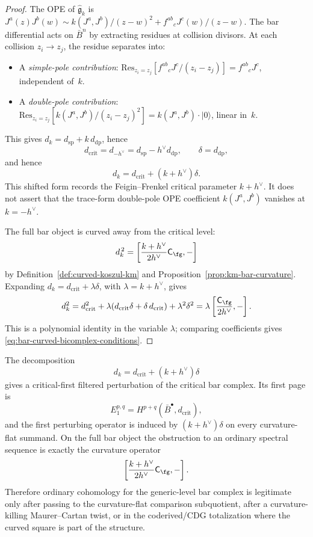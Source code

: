 \begin{proof}
The OPE of $\widehat{\mathfrak{g}}_k$ is
$J^a(z) J^b(w) \sim k(J^a, J^b)/(z-w)^2 + f^{ab}{}_c J^c(w)/(z-w)$.
The bar differential acts on $\bar{B}^n$ by extracting residues at collision
divisors. At each collision $z_i \to z_j$, the residue
separates into:
\begin{itemize}
\item A \emph{simple-pole contribution}:
$\mathrm{Res}_{z_i = z_j}[f^{ab}{}_c J^c / (z_i - z_j)]
= f^{ab}{}_c J^c$, independent of~$k$.
\item A \emph{double-pole contribution}:
$\mathrm{Res}_{z_i = z_j}[k(J^a, J^b) / (z_i - z_j)^2]
= k(J^a, J^b) \cdot |0\rangle$, linear in~$k$.
\end{itemize}
This gives \(d_k=d_{\mathrm{sp}}+k\,d_{\mathrm{dp}}\), hence
\[
d_{\mathrm{crit}}=d_{-h^\vee}=d_{\mathrm{sp}}-h^\vee d_{\mathrm{dp}},
\qquad
\delta=d_{\mathrm{dp}},
\]
and hence
\[
d_k=d_{\mathrm{crit}}+(k+h^\vee)\delta.
\]
This shifted form records the Feigin--Frenkel critical parameter
\(k+h^\vee\). It does not assert that the trace-form double-pole OPE
coefficient \(k(J^a,J^b)\) vanishes at \(k=-h^\vee\).

The full bar object is curved away from the critical level:
\[
d_k^{\,2}
=
\left[
\frac{k+h^\vee}{2h^\vee}\mathsf C_{\fg},-
\right]
\]
by Definition~\ref{def:curved-koszul-km} and
Proposition~\ref{prop:km-bar-curvature}.  Expanding
\(d_k=d_{\mathrm{crit}}+\lambda\delta\), with
\(\lambda=k+h^\vee\), gives
\[
d_k^2
= d_{\mathrm{crit}}^2
+ \lambda(d_{\mathrm{crit}}\delta + \delta\, d_{\mathrm{crit}})
+ \lambda^2 \delta^2
=
\lambda\left[\frac{\mathsf C_{\fg}}{2h^\vee},-\right].
\]
This is a polynomial identity in the variable
$\lambda$; comparing coefficients gives
\eqref{eq:bar-curved-bicomplex-conditions}.
\end{proof}

\begin{corollary}
\label{cor:critical-level-spectral}
The decomposition
\[
d_k=d_{\mathrm{crit}}+(k+h^\vee)\delta
\]
gives a critical-first filtered perturbation of the critical bar
complex.  Its first page is
\[
E_1^{p,q}
=H^{p+q}(\bar{B}^{\bullet},d_{\mathrm{crit}}),
\]
and the first perturbing operator is induced by
$(k+h^\vee)\delta$ on every curvature-flat summand.  On the full bar
object the obstruction to an ordinary spectral sequence is exactly
the curvature operator
\[
\left[\frac{k+h^\vee}{2h^\vee}\mathsf C_{\fg},-\right].
\]
Therefore ordinary cohomology for the generic-level bar complex is
legitimate only after passing to the curvature-flat comparison
subquotient, after a curvature-killing Maurer--Cartan twist, or in
the coderived/CDG totalization where the curved square is part of the
structure.
\end{corollary}

